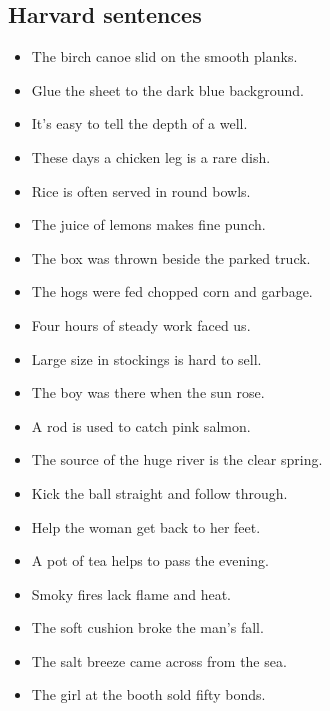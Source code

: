 \documentclass[a4paper, 12pt]{article}
\begin{document}
\begin{appendix}
\subsection{Harvard sentences}
\begin{itemize}
\item The birch canoe slid on the smooth planks.
\item Glue the sheet to the dark blue background.
\item It's easy to tell the depth of a well.
\item These days a chicken leg is a rare dish.
\item Rice is often served in round bowls.
\item The juice of lemons makes fine punch.
\item The box was thrown beside the parked truck.
\item The hogs were fed chopped corn and garbage.
\item Four hours of steady work faced us.
\item Large size in stockings is hard to sell.
\item The boy was there when the sun rose.
\item A rod is used to catch pink salmon.
\item The source of the huge river is the clear spring.
\item Kick the ball straight and follow through.
\item Help the woman get back to her feet.
\item A pot of tea helps to pass the evening.
\item Smoky fires lack flame and heat.
\item The soft cushion broke the man's fall.
\item The salt breeze came across from the sea.
\item The girl at the booth sold fifty bonds.
\end{itemize}



\end{appendix}
\end{document}
